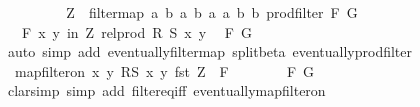 \begin{isabellebody}
\ \ \isamarkupfalse%
\isanewline
\ \ \ \ \isamarkupfalse%
\ {\isacharquery}{\kern0pt}Z\ {\isacharequal}{\kern0pt}\ {\isachardoublequoteopen}filtermap\ {\isacharparenleft}{\kern0pt}{\isasymlambda}{\isacharparenleft}{\kern0pt}{\isacharparenleft}{\kern0pt}a{\isacharcomma}{\kern0pt}\ b{\isacharparenright}{\kern0pt}{\isacharcomma}{\kern0pt}\ {\isacharparenleft}{\kern0pt}a{\isacharprime}{\kern0pt}{\isacharcomma}{\kern0pt}\ b{\isacharprime}{\kern0pt}{\isacharparenright}{\kern0pt}{\isacharparenright}{\kern0pt}{\isachardot}{\kern0pt}\ {\isacharparenleft}{\kern0pt}{\isacharparenleft}{\kern0pt}a{\isacharcomma}{\kern0pt}\ a{\isacharprime}{\kern0pt}{\isacharparenright}{\kern0pt}{\isacharcomma}{\kern0pt}\ {\isacharparenleft}{\kern0pt}b{\isacharcomma}{\kern0pt}\ b{\isacharprime}{\kern0pt}{\isacharparenright}{\kern0pt}{\isacharparenright}{\kern0pt}{\isacharparenright}{\kern0pt}\ {\isacharparenleft}{\kern0pt}prod{\isacharunderscore}{\kern0pt}filter\ F\ G{\isacharparenright}{\kern0pt}{\isachardoublequoteclose}\isanewline
\ \ \ \ \isamarkupfalse%
\ {\isacharasterisk}{\kern0pt}{\isacharcolon}{\kern0pt}\ {\isachardoublequoteopen}{\isasymforall}\isactrlsub F\ {\isacharparenleft}{\kern0pt}x{\isacharcomma}{\kern0pt}\ y{\isacharparenright}{\kern0pt}\ in\ {\isacharquery}{\kern0pt}Z{\isachardot}{\kern0pt}\ rel{\isacharunderscore}{\kern0pt}prod\ R\ S\ x\ y{\isachardoublequoteclose}\ \isamarkupfalse%
\ F\ G\isanewline
\ \ \ \ \ \ \isamarkupfalse%
{\isacharparenleft}{\kern0pt}auto\ simp\ add{\isacharcolon}{\kern0pt}\ eventually{\isacharunderscore}{\kern0pt}filtermap\ split{\isacharunderscore}{\kern0pt}beta\ eventually{\isacharunderscore}{\kern0pt}prod{\isacharunderscore}{\kern0pt}filter{\isacharparenright}{\kern0pt}\isanewline
\ \ \ \ \isamarkupfalse%
\ {\isachardoublequoteopen}map{\isacharunderscore}{\kern0pt}filter{\isacharunderscore}{\kern0pt}on\ {\isacharbraceleft}{\kern0pt}{\isacharparenleft}{\kern0pt}x{\isacharcomma}{\kern0pt}\ y{\isacharparenright}{\kern0pt}{\isachardot}{\kern0pt}\ {\isacharquery}{\kern0pt}RS\ x\ y{\isacharbraceright}{\kern0pt}\ fst\ {\isacharquery}{\kern0pt}Z\ {\isacharequal}{\kern0pt}\ {\isacharquery}{\kern0pt}F{\isachardoublequoteclose}\isanewline
\ \ \ \ \ \ \isamarkupfalse%
\ F\ G\isanewline
\ \ \ \ \ \ \isamarkupfalse%
{\isacharparenleft}{\kern0pt}clarsimp\ simp\ add{\isacharcolon}{\kern0pt}\ filter{\isacharunderscore}{\kern0pt}eq{\isacharunderscore}{\kern0pt}iff\ eventually{\isacharunderscore}{\kern0pt}map{\isacharunderscore}{\kern0pt}filter{\isacharunderscore}{\kern0pt}on\ {\isacharasterisk}{\kern0pt}{\isacharparenright}{\kern0pt}\isanewline

\end{isabellebody}
